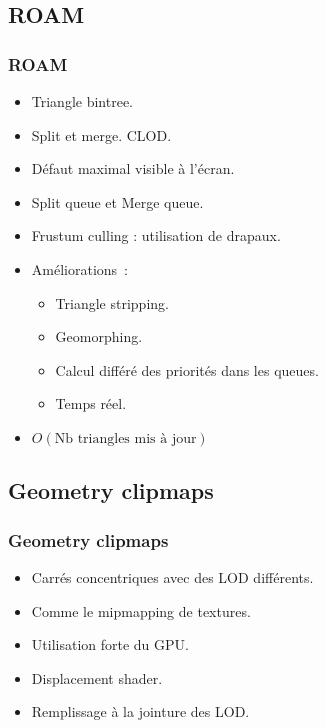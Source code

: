 \documentclass[hyperref={pdfpagelabels=false}]{beamer}
\begin{document}
\subsection{ROAM}
\begin{frame}
  \frametitle{ROAM}
  \begin{itemize}
  \item Triangle bintree.
  \item Split et merge. CLOD.
  \item Défaut maximal visible à l'écran.
  \item Split queue et Merge queue.
  \item Frustum culling : utilisation de drapaux.
  \item Améliorations~:
    \begin{itemize}
    \item Triangle stripping.
    \item Geomorphing.
    \item Calcul différé des priorités dans les queues.
    \item Temps réel.
    \end{itemize}
  \item $O(\text{Nb triangles mis à jour})$
  \end{itemize}
\end{frame}

\subsection{Geometry clipmaps}
\begin{frame}
  \frametitle{Geometry clipmaps}
  \begin{itemize}
  \item Carrés concentriques avec des LOD différents.
  \item Comme le mipmapping de textures.
  \item Utilisation forte du GPU.
  \item Displacement shader.
  \item Remplissage à la jointure des LOD.
  \end{itemize}
\end{frame}
\end{document}
